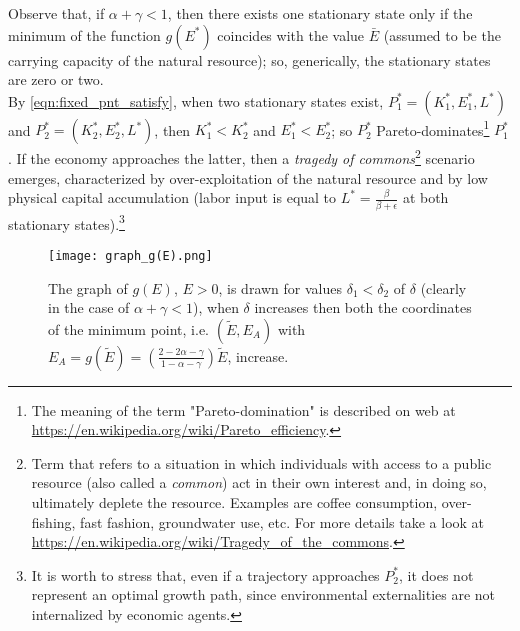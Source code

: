 Observe that, if $\alpha+\gamma<1$, then there exists one stationary state only if the minimum of the function $g(E^*)$ coincides with the value $\bar{E}$ (assumed to be the carrying capacity of the natural resource); so, generically, the stationary states are zero or two.\\
By \eqref{eqn:fixed_pnt_satisfy}, when two stationary states exist, $P_1^* = (K_1^*,E_1^*,L^*)$ and $P_2^* = (K_2^*,E_2^*,L^*)$, then $K_1^* < K_2^*$ and $E_1^* < E_2^*$; so $P_2^*$ Pareto-dominates\footnote{The meaning of the term "Pareto-domination" is described on web at \url{https://en.wikipedia.org/wiki/Pareto_efficiency}.} 
$P_1^*$.
If the economy approaches the latter, then a \textit{tragedy of commons}\footnote{Term that refers to a situation in which individuals with access to a public resource (also called a \textit{common}) act in their own interest and, in doing so, ultimately deplete the resource. Examples are coffee consumption, over-fishing, fast fashion, groundwater use, etc. For more details take a look at \url{https://en.wikipedia.org/wiki/Tragedy_of_the_commons}.} 
scenario emerges, characterized by over-exploitation of the natural resource and by low physical capital accumulation (labor input is equal to $L^* = \frac{\beta}{\beta+\epsilon}$ at both stationary states).\footnote{It is worth to stress that, even if a trajectory approaches $P_2^*$, it does not represent an optimal growth path, since environmental externalities are not internalized by economic agents.}
\begin{figure}[h!]
	\centering
	\texttt{[image: graph\_g(E).png]}
	\caption{The graph of $g(E)$, $E>0$, is drawn for values $\delta_1<\delta_2$ of $\delta$ (clearly in the case of $\alpha+\gamma<1$), when $\delta$ increases then both the coordinates of the minimum point, i.e. $(\tilde{E}, E_A)$ with $E_A=g(\tilde{E})=(\frac{2-2\alpha-\gamma}{1-\alpha-\gamma})\tilde{E}$, increase.}
	\label{fig:graph_g(E)}
\end{figure}

